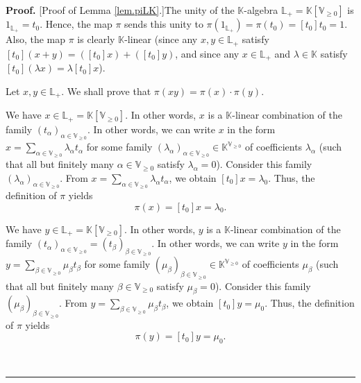 \documentclass[numbers=enddot,12pt,final,onecolumn,notitlepage]{scrartcl}%
\theoremstyle{definition}
\newenvironment{proof}[1][Proof]{\noindent\textbf{#1.} }{\ \rule{0.5em}{0.5em}}
\let\sumnonlimits\sum
\renewcommand{\sum}{\sumnonlimits\limits}
\renewcommand{\geq}{\geqslant}
\theoremstyle{plainsl}
\begin{document}
\begin{proof}
[Proof of Lemma \ref{lem.piLK}.]The unity of the $\mathbb{K}$-algebra
$\mathbb{L}_{+}=\mathbb{K}\left[  \mathbb{V}_{\geq0}\right]  $ is
$1_{\mathbb{L}_{+}}=t_{0}$. Hence, the map $\pi$ sends this unity to
$\pi\left(  1_{\mathbb{L}_{+}}\right)  =\pi\left(  t_{0}\right)  =\left[
t_{0}\right]  t_{0}=1$. Also, the map $\pi$ is clearly $\mathbb{K}$-linear
(since any $x,y\in\mathbb{L}_{+}$ satisfy $\left[  t_{0}\right]  \left(
x+y\right)  =\left(  \left[  t_{0}\right]  x\right)  +\left(  \left[
t_{0}\right]  y\right)  $, and since any $x\in\mathbb{L}_{+}$ and $\lambda
\in\mathbb{K}$ satisfy $\left[  t_{0}\right]  \left(  \lambda x\right)
=\lambda\left[  t_{0}\right]  x$).

Let $x,y\in\mathbb{L}_{+}$. We shall prove that $\pi\left(  xy\right)
=\pi\left(  x\right)  \cdot\pi\left(  y\right)  $.

We have $x\in\mathbb{L}_{+}=\mathbb{K}\left[  \mathbb{V}_{\geq0}\right]  $. In
other words, $x$ is a $\mathbb{K}$-linear combination of the family $\left(
t_{\alpha}\right)  _{\alpha\in\mathbb{V}_{\geq0}}$. In other words, we can
write $x$ in the form $x=\sum_{\alpha\in\mathbb{V}_{\geq0}}\lambda_{\alpha
}t_{\alpha}$ for some family $\left(  \lambda_{\alpha}\right)  _{\alpha
\in\mathbb{V}_{\geq0}}\in\mathbb{K}^{\mathbb{V}_{\geq0}}$ of coefficients
$\lambda_{\alpha}$ (such that all but finitely many $\alpha\in\mathbb{V}%
_{\geq0}$ satisfy $\lambda_{\alpha}=0$). Consider this family $\left(
\lambda_{\alpha}\right)  _{\alpha\in\mathbb{V}_{\geq0}}$. From $x=\sum
_{\alpha\in\mathbb{V}_{\geq0}}\lambda_{\alpha}t_{\alpha}$, we obtain $\left[
t_{0}\right]  x=\lambda_{0}$. Thus, the definition of $\pi$ yields%
\begin{equation}
\pi\left(  x\right)  =\left[  t_{0}\right]  x=\lambda_{0}.
\label{pf.lem.piLK.pix=}%
\end{equation}


We have $y\in\mathbb{L}_{+}=\mathbb{K}\left[  \mathbb{V}_{\geq0}\right]  $. In
other words, $y$ is a $\mathbb{K}$-linear combination of the family $\left(
t_{\alpha}\right)  _{\alpha\in\mathbb{V}_{\geq0}}=\left(  t_{\beta}\right)
_{\beta\in\mathbb{V}_{\geq0}}$. In other words, we can write $y$ in the form
$y=\sum_{\beta\in\mathbb{V}_{\geq0}}\mu_{\beta}t_{\beta}$ for some family
$\left(  \mu_{\beta}\right)  _{\beta\in\mathbb{V}_{\geq0}}\in\mathbb{K}%
^{\mathbb{V}_{\geq0}}$ of coefficients $\mu_{\beta}$ (such that all but
finitely many $\beta\in\mathbb{V}_{\geq0}$ satisfy $\mu_{\beta}=0$). Consider
this family $\left(  \mu_{\beta}\right)  _{\beta\in\mathbb{V}_{\geq0}}$. From
$y=\sum_{\beta\in\mathbb{V}_{\geq0}}\mu_{\beta}t_{\beta}$, we obtain $\left[
t_{0}\right]  y=\mu_{0}$. Thus, the definition of $\pi$ yields%
\begin{equation}
\pi\left(  y\right)  =\left[  t_{0}\right]  y=\mu_{0}.
\label{pf.lem.piLK.piy=}%
\end{equation}



\end{proof}
\end{document}
